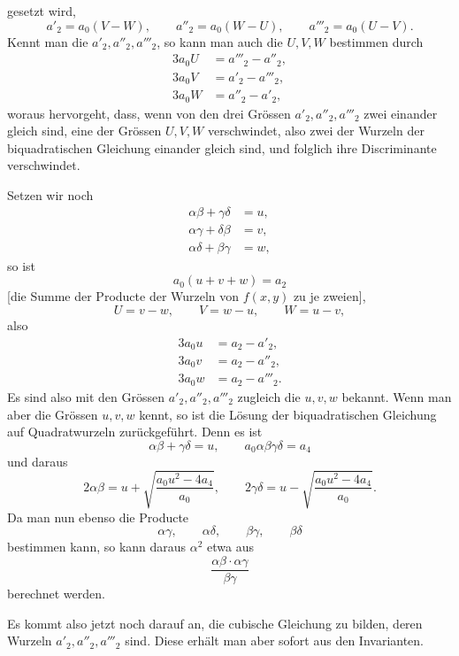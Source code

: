 \documentclass[11pt]{article}
\begin{document}
gesetzt wird,
\begin{equation}
 a'_2=a_0(V-W),
 \qquad a''_2=a_0(W-U),
 \qquad a'''_2=a_0(U-V).
\tag{7}
\end{equation}
Kennt man die $a'_2,a''_2,a'''_2$, so kann man auch die $U,V,W$ bestimmen durch
\begin{equation}
\begin{aligned}
 3a_0U&=a'''_2-a''_2,\\
 3a_0V&=a'_2-a'''_2,\\
 3a_0W&=a''_2-a'_2,
\end{aligned}
\tag{8}
\end{equation}
woraus hervorgeht, dass, wenn von den drei Grössen $a'_2,a''_2,a'''_2$ zwei einander gleich sind, eine der Grössen $U,V,W$ verschwindet, also zwei der Wurzeln der biquadratischen Gleichung einander gleich sind, und folglich ihre Discriminante verschwindet.

Setzen wir noch
\begin{equation}
\begin{aligned}
 \alpha\beta+\gamma\delta&=u,\\
 \alpha\gamma+\delta\beta&=v,\\
 \alpha\delta+\beta\gamma&=w,
\end{aligned}
\tag{9}
\end{equation}
so ist
\[
 a_0(u+v+w)=a_2
\]
[die Summe der Producte der Wurzeln von $f(x,y)$ zu je zweien],
\[
 U=v-w,
 \qquad V=w-u,
 \qquad W=u-v,
\]
also
\begin{equation}
\begin{aligned}
 3a_0u&=a_2-a'_2,\\
 3a_0v&=a_2-a''_2,\\
 3a_0w&=a_2-a'''_2.
\end{aligned}
\tag{10}
\end{equation}
Es sind also mit den Grössen $a'_2,a''_2,a'''_2$ zugleich die $u,v,w$ bekannt. Wenn man aber die Grössen $u,v,w$ kennt, so ist die Lösung der biquadratischen Gleichung auf Quadratwurzeln zurückgeführt. Denn es ist
\[
 \alpha\beta+\gamma\delta=u,
 \qquad a_0\alpha\beta\gamma\delta=a_4
\]
und daraus
\[
 2\alpha\beta=u+\sqrt{\frac{a_0u^2-4a_4}{a_0}},
 \qquad
 2\gamma\delta=u-\sqrt{\frac{a_0u^2-4a_4}{a_0}}.
\]
Da man nun ebenso die Producte
\[
 \alpha\gamma,
 \qquad \alpha\delta,
 \qquad \beta\gamma,
 \qquad \beta\delta
\]
bestimmen kann, so kann daraus $\alpha^2$ etwa aus
\[
 \frac{\alpha\beta\cdot\alpha\gamma}{\beta\gamma}
\]
berechnet werden.

Es kommt also jetzt noch darauf an, die cubische Gleichung zu bilden, deren Wurzeln $a'_2,a''_2,a'''_2$ sind. Diese erhält man aber sofort aus den Invarianten.
\end{document}
